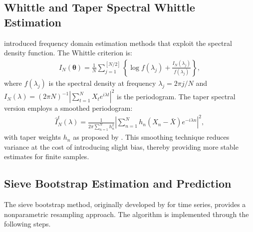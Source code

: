 \documentclass[twoside]{article}
\begin{document}
\subsection{Whittle and Taper Spectral Whittle Estimation}
\cite{Nasirzadeh:2024} introduced frequency domain estimation methods that exploit the spectral density function. The Whittle criterion is:
\begin{eqnarray*}
\hat{I}_N(\boldsymbol{\theta}) = \frac{1}{N}\sum_{j=1}^{[N/2]} \left\{\log f(\lambda_j) + \frac{I_N(\lambda_j)}{f(\lambda_j)}\right\},
\end{eqnarray*}
where $f(\lambda_j)$ is the spectral density at frequency $\lambda_j = 2\pi j/N$ and $I_N(\lambda) = (2\pi N)^{-1}|\sum_{t=1}^N X_t e^{i\lambda t}|^2$ is the periodogram. The taper spectral version employs a smoothed periodogram:
\begin{eqnarray*}
\hat{I}_N^t(\lambda) = \frac{1}{2\pi\sum_{n=1}^N h_n^2}\left|\sum_{n=1}^N h_n (X_n-\bar{X})e^{-i\lambda n}\right|^2,
\end{eqnarray*}
with taper weights $h_n$ as proposed by \cite{Riedel:1995}. This smoothing technique reduces variance at the cost of introducing slight bias, thereby providing more stable estimates for finite samples.

\subsection{Sieve Bootstrap Estimation and Prediction}
The sieve bootstrap method, originally developed by \cite{Buhlmann:1997} for time series, provides a nonparametric resampling approach. The algorithm is implemented through the following steps.
\end{document}
